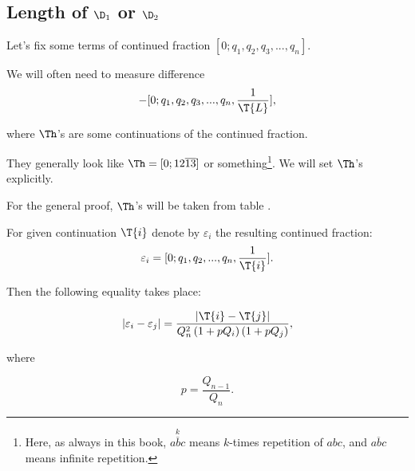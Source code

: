 \subsection{Length of $\D_1$ or $\D_2$}

Let's fix some terms of continued fraction $[0; q_1, q_2, q_3, ..., q_n]$.

We will often need to measure difference
\begin{equation*}
	[0; q_1, q_2, q_3, ..., q_n, \frac{1}{\T{R}}] - 
	[0; q_1, q_2, q_3, ..., q_n, \frac{1}{\T{L}}],
\end{equation*}

where $\Th$'s are some continuations of the continued fraction.

They generally look like $\Th = [0;12\overline{13}]$ or something\footnote{%
	Here, as always in this book, $\overset{k}{\overline{abc}}$
	means $k$-times repetition of $abc$,
	and $\overline{abc}$ means infinite repetition.}.
We will set $\Th$'s explicitly.

For the general proof, $\Th$'s will be taken from table .

\begin{designation}
	For given continuation $\T{i}$ denote by $\varepsilon_i$ the resulting continued fraction:
	\begin{equation}\label{epsilon_rule}
		\varepsilon_i = [0; q_1, q_2, ..., q_n, \frac{1}{\T{i}}].
	\end{equation}
\end{designation}

Then the following equality takes place:

\begin{equation}\label{varepsilons_difference}
	| \varepsilon_i - \varepsilon_j | = 
	\dfrac{| \T{i} - \T{j} |}
	{Q_n^2 \left(1 + pQ_i\right) \left(1 + pQ_j\right)},
\end{equation}

where

\begin{equation*}
	p = \dfrac{Q_{n-1}}{Q_n}.
\end{equation*}
